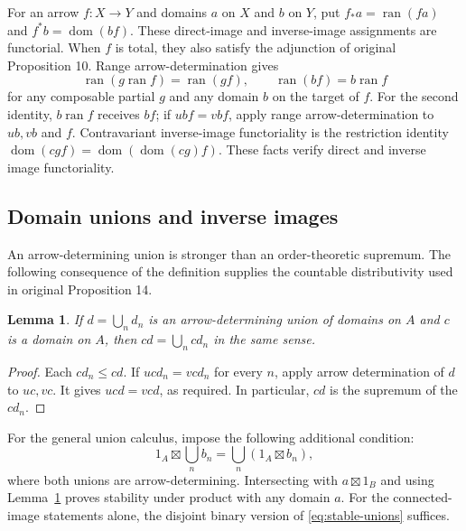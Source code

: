 \documentclass[11pt]{article}
\newtheorem{lemma}[theorem]{Lemma}
\newcommand{\dom}{\operatorname{dom}}\newcommand{\ran}{\operatorname{ran}}
\begin{document}
For an arrow $f:X\to Y$ and domains $a$ on $X$ and $b$ on $Y$, put $f_*a=\ran(fa)$ and $f^*b=\dom(bf)$. These direct-image and inverse-image assignments are functorial. When $f$ is total, they also satisfy the adjunction of original Proposition 10. Range arrow-determination gives
\[
\ran(g\ran f)=\ran(gf),\qquad
\ran(bf)=b\ran f
\]
for any composable partial $g$ and any domain $b$ on the target of $f$. For the second identity, $b\ran f$ receives $bf$; if $ubf=vbf$, apply range arrow-determination to $ub,vb$ and $f$. Contravariant inverse-image functoriality is the restriction identity $\dom(cgf)=\dom(\dom(cg)f)$. These facts verify direct and inverse image functoriality.

\subsection{Domain unions and inverse images}\label{sec:stable-unions}
An arrow-determining union is stronger than an order-theoretic supremum. The following consequence of the definition supplies the countable distributivity used in original Proposition 14.
\begin{lemma}\label{lem:meet-union}
If $d=\bigcup_n d_n$ is an arrow-determining union of domains on $A$ and $c$ is a domain on $A$, then $cd=\bigcup_n cd_n$ in the same sense.
\end{lemma}
\begin{proof}
Each $cd_n\leq cd$. If $ucd_n=vcd_n$ for every $n$, apply arrow determination of $d$ to $uc,vc$. It gives $ucd=vcd$, as required. In particular, $cd$ is the supremum of the $cd_n$.
\end{proof}

For the general union calculus, impose the following additional condition:
\begin{equation}\label{eq:stable-unions}
1_A\boxtimes\bigcup_n b_n
=\bigcup_n(1_A\boxtimes b_n),
\end{equation}
where both unions are arrow-determining. Intersecting with $a\boxtimes1_B$ and using Lemma~\ref{lem:meet-union} proves stability under product with any domain $a$. For the connected-image statements alone, the disjoint binary version of \eqref{eq:stable-unions} suffices.
\end{document}

